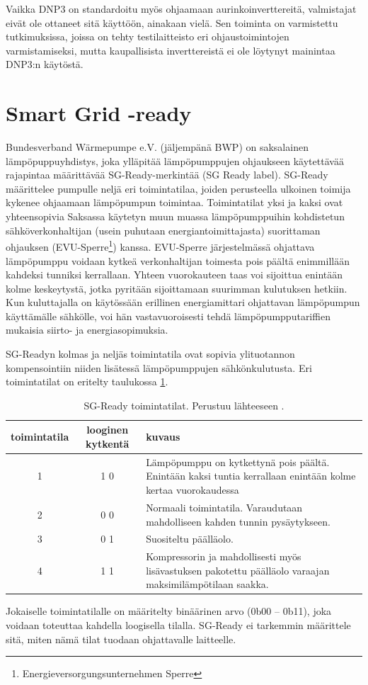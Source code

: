   Vaikka DNP3 on standardoitu myös ohjaamaan aurinkoinverttereitä, valmistajat eivät ole ottaneet sitä käyttöön, ainakaan vielä. Sen toiminta on varmistettu tutkimuksissa, joissa on tehty testilaitteisto eri ohjaustoimintojen varmistamiseksi, mutta kaupallisista inverttereistä ei ole löytynyt mainintaa DNP3:n käytöstä. \parencite{DNP3Inv}


\section{Smart Grid -ready}

  Bundesverband Wärmepumpe e.V. (jäljempänä BWP) on saksalainen lämpöpuppuyhdistys, joka ylläpitää lämpöpumppujen ohjaukseen käytettävää rajapintaa määrittävää \gls{SG}-Ready-merkintää (\gls{SG} Ready label). \gls{SG}-Ready määrittelee pumpulle neljä eri toimintatilaa, joiden perusteella ulkoinen toimija kykenee ohjaamaan lämpöpumpun toimintaa. Toimintatilat yksi ja kaksi ovat yhteensopivia Saksassa käytetyn muun muassa lämpöpumppuihin kohdistetun sähköverkonhaltijan (usein puhutaan energiantoimittajasta) suorittaman ohjauksen (EVU-Sperre\footnote{Energieversorgungsunternehmen Sperre}) kanssa.\parencite{SGReadyReg} EVU-Sperre järjestelmässä ohjattava lämpöpumppu voidaan kytkeä verkonhaltijan toimesta pois päältä enimmillään kahdeksi tunniksi kerrallaan. Yhteen vuorokauteen taas voi sijoittua enintään kolme keskeytystä, jotka pyritään sijoittamaan suurimman kulutuksen hetkiin. Kun kuluttajalla on käytössään erillinen energiamittari ohjattavan lämpöpumpun käyttämälle sähkölle, voi hän vastavuoroisesti tehdä lämpöpumpputariffien mukaisia siirto- ja energiasopimuksia. \parencite{enwg, VDEARN4100}

  SG-Readyn  kolmas ja neljäs toimintatila ovat sopivia ylituotannon kompensointiin niiden lisätessä lämpöpumppujen sähkönkulutusta. Eri toimintatilat on eritelty taulukossa \ref{sgready}.
  \begin{table}[h]
    \centering
    \caption[\gls{SG}-Ready toimintatilat]{\gls{SG}-Ready toimintatilat. Perustuu lähteeseen \parencite{SGReadyReg}.}
    \begin{tabular}{|c|c|p{3in}|}
      \hline
      \rowcolor{lightgray} toimintatila & looginen kytkentä & kuvaus \\\hline
      1 & 1 0 & Lämpöpumppu on kytkettynä pois päältä. Enintään kaksi tuntia kerrallaan enintään kolme kertaa vuorokaudessa \\\hline
      2 & 0 0 & Normaali toimintatila. Varaudutaan mahdolliseen kahden tunnin pysäytykseen. \\\hline
      3 & 0 1 & Suositeltu päälläolo. \\ \hline
      4 & 1 1 & Kompressorin ja mahdollisesti myös lisävastuksen pakotettu päälläolo varaajan maksimilämpötilaan saakka. \\\hline
    \end{tabular}
    \label{sgready}
  \end{table}
  Jokaiselle toimintatilalle on määritelty binäärinen arvo (0b00 -- 0b11), joka voidaan toteuttaa kahdella loogisella tilalla. SG-Ready ei tarkemmin määrittele sitä, miten nämä tilat tuodaan ohjattavalle laitteelle. \parencite{SGReadyReg}

